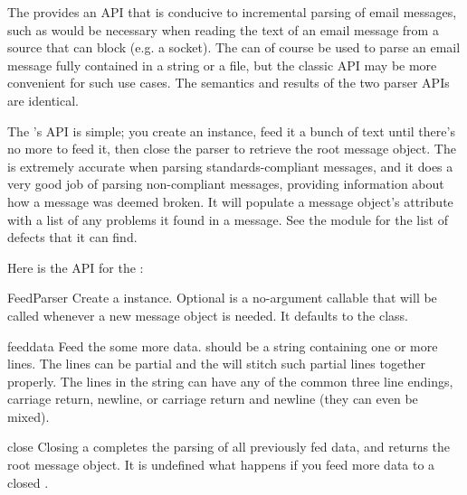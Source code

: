 
The  provides an API that is conducive to incremental
parsing of email messages, such as would be necessary when reading the text of
an email message from a source that can block (e.g. a socket).  The
 can of course be used to parse an email message fully
contained in a string or a file, but the classic  API may be
more convenient for such use cases.  The semantics and results of the two
parser APIs are identical.

The 's API is simple; you create an instance, feed it a
bunch of text until there's no more to feed it, then close the parser to
retrieve the root message object.  The  is extremely
accurate when parsing standards-compliant messages, and it does a very good
job of parsing non-compliant messages, providing information about how a
message was deemed broken.  It will populate a message object's 
attribute with a list of any problems it found in a message.  See the
 module for the list of defects that it can find.

Here is the API for the :

\begin{classdesc}{FeedParser}{}
Create a  instance.  Optional  is a
no-argument callable that will be called whenever a new message object is
needed.  It defaults to the  class.
\end{classdesc}

\begin{methoddesc}[FeedParser]{feed}{data}
Feed the  some more data.   should be a
string containing one or more lines.  The lines can be partial and the
 will stitch such partial lines together properly.  The
lines in the string can have any of the common three line endings, carriage
return, newline, or carriage return and newline (they can even be mixed).
\end{methoddesc}

\begin{methoddesc}[FeedParser]{close}{}
Closing a  completes the parsing of all previously fed data,
and returns the root message object.  It is undefined what happens if you feed
more data to a closed .
\end{methoddesc}

